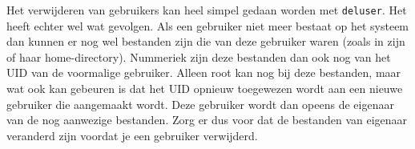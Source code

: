 Het verwijderen van gebruikers kan heel simpel gedaan worden met \texttt{deluser}. Het heeft echter wel wat gevolgen. Als een gebruiker niet meer bestaat op het systeem dan kunnen er nog wel bestanden zijn die van deze gebruiker waren (zoals in zijn of haar home-directory). Nummeriek zijn deze bestanden dan ook nog van het UID van de voormalige gebruiker. Alleen root kan nog bij deze bestanden, maar wat ook kan gebeuren is dat het UID opnieuw toegewezen wordt aan een nieuwe gebruiker die aangemaakt wordt. Deze gebruiker wordt dan opeens de eigenaar van de nog aanwezige bestanden. Zorg er dus voor dat de bestanden van eigenaar veranderd zijn voordat je een gebruiker verwijderd.
